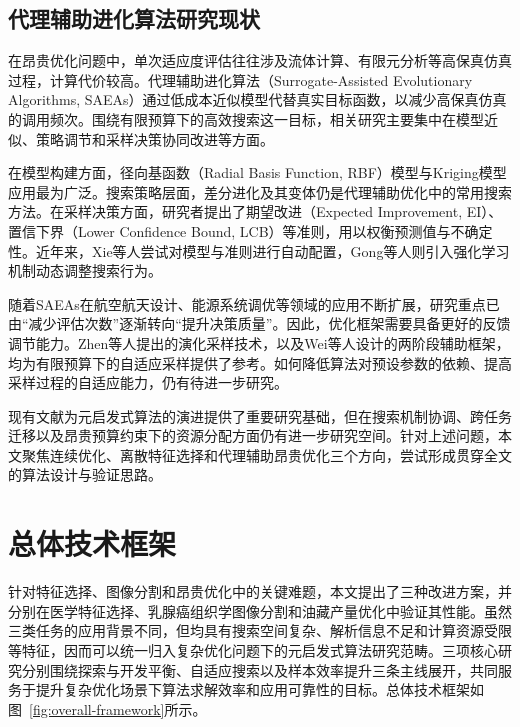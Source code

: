 \subsection{代理辅助进化算法研究现状}

在昂贵优化问题中，单次适应度评估往往涉及流体计算、有限元分析等高保真仿真过程，计算代价较高\cite{liu2023airfoils,kumar2024optimization}。代理辅助进化算法（Surrogate-Assisted Evolutionary Algorithms, SAEAs）通过低成本近似模型代替真实目标函数，以减少高保真仿真的调用频次\cite{he2023review,jin2018data}。围绕有限预算下的高效搜索这一目标，相关研究主要集中在模型近似、策略调节和采样决策协同改进等方面。

在模型构建方面，径向基函数（Radial Basis Function, RBF）模型\cite{regis2013evolutionary}与Kriging模型\cite{buche2005accelerating,liu2013gaussian}应用最为广泛。搜索策略层面，差分进化及其变体仍是代理辅助优化中的常用搜索方法\cite{mallipeddi2015evolving,stanovov2023surrogate}。在采样决策方面，研究者提出了期望改进（Expected Improvement, EI）\cite{jones1998efficient}、置信下界（Lower Confidence Bound, LCB）\cite{li2023elite}等准则，用以权衡预测值与不确定性。近年来，Xie等人\cite{xie2023surrogate}尝试对模型与准则进行自动配置，Gong等人\cite{gong2024surrogate}则引入强化学习机制动态调整搜索行为。

随着SAEAs在航空航天设计、能源系统调优等领域的应用不断扩展，研究重点已由“减少评估次数”逐渐转向“提升决策质量”。因此，优化框架需要具备更好的反馈调节能力。Zhen等人\cite{zhen2022evolutionary}提出的演化采样技术，以及Wei等人\cite{wei2023efficient}设计的两阶段辅助框架，均为有限预算下的自适应采样提供了参考。如何降低算法对预设参数的依赖、提高采样过程的自适应能力，仍有待进一步研究。

现有文献为元启发式算法的演进提供了重要研究基础，但在搜索机制协调、跨任务迁移以及昂贵预算约束下的资源分配方面仍有进一步研究空间。针对上述问题，本文聚焦连续优化、离散特征选择和代理辅助昂贵优化三个方向，尝试形成贯穿全文的算法设计与验证思路。

\section{总体技术框架}

针对特征选择、图像分割和昂贵优化中的关键难题，本文提出了三种改进方案，并分别在医学特征选择、乳腺癌组织学图像分割和油藏产量优化中验证其性能。虽然三类任务的应用背景不同，但均具有搜索空间复杂、解析信息不足和计算资源受限等特征，因而可以统一归入复杂优化问题下的元启发式算法研究范畴。三项核心研究分别围绕探索与开发平衡、自适应搜索以及样本效率提升三条主线展开，共同服务于提升复杂优化场景下算法求解效率和应用可靠性的目标。总体技术框架如图~\ref{fig:overall-framework}所示。

